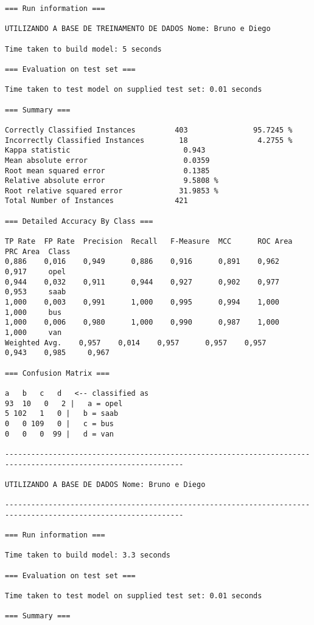 \documentclass[
	article,			%
	11pt,				%
	oneside,			%
	a4paper,			%
	english,			%
	brazil,				%
	sumario=tradicional
	]{abntex2}
\begin{document}
\begin{lstlisting}
=== Run information ===

UTILIZANDO A BASE DE TREINAMENTO DE DADOS Nome: Bruno e Diego

Time taken to build model: 5 seconds

=== Evaluation on test set ===

Time taken to test model on supplied test set: 0.01 seconds

=== Summary ===

Correctly Classified Instances         403               95.7245 %
Incorrectly Classified Instances        18                4.2755 %
Kappa statistic                          0.943 
Mean absolute error                      0.0359
Root mean squared error                  0.1385
Relative absolute error                  9.5808 %
Root relative squared error             31.9853 %
Total Number of Instances              421     

=== Detailed Accuracy By Class ===

TP Rate  FP Rate  Precision  Recall   F-Measure  MCC      ROC Area  PRC Area  Class
0,886    0,016    0,949      0,886    0,916      0,891    0,962     0,917     opel
0,944    0,032    0,911      0,944    0,927      0,902    0,977     0,953     saab
1,000    0,003    0,991      1,000    0,995      0,994    1,000     1,000     bus
1,000    0,006    0,980      1,000    0,990      0,987    1,000     1,000     van
Weighted Avg.    0,957    0,014    0,957      0,957    0,957      0,943    0,985     0,967     

=== Confusion Matrix ===

a   b   c   d   <-- classified as
93  10   0   2 |   a = opel
5 102   1   0 |   b = saab
0   0 109   0 |   c = bus
0   0   0  99 |   d = van

---------------------------------------------------------------------------------------------------------------

UTILIZANDO A BASE DE DADOS Nome: Bruno e Diego

---------------------------------------------------------------------------------------------------------------

=== Run information ===

Time taken to build model: 3.3 seconds

=== Evaluation on test set ===

Time taken to test model on supplied test set: 0.01 seconds

=== Summary ===


\end{lstlisting}
\end{document}
